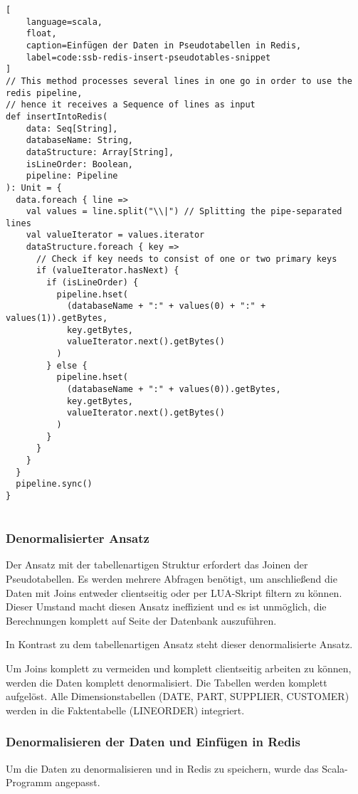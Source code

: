 \begin{lstlisting}[
    language=scala,
    float,
    caption=Einfügen der Daten in Pseudotabellen in Redis,
    label=code:ssb-redis-insert-pseudotables-snippet
]
// This method processes several lines in one go in order to use the redis pipeline,
// hence it receives a Sequence of lines as input
def insertIntoRedis(
    data: Seq[String],
    databaseName: String,
    dataStructure: Array[String],
    isLineOrder: Boolean,
    pipeline: Pipeline
): Unit = {
  data.foreach { line =>
    val values = line.split("\\|") // Splitting the pipe-separated lines
    val valueIterator = values.iterator
    dataStructure.foreach { key =>
      // Check if key needs to consist of one or two primary keys
      if (valueIterator.hasNext) {
        if (isLineOrder) {
          pipeline.hset(
            (databaseName + ":" + values(0) + ":" + values(1)).getBytes,
            key.getBytes,
            valueIterator.next().getBytes()
          )
        } else {
          pipeline.hset(
            (databaseName + ":" + values(0)).getBytes,
            key.getBytes,
            valueIterator.next().getBytes()
          )
        }
      }
    }
  }
  pipeline.sync()
}


\end{lstlisting}

\subsubsection{Denormalisierter Ansatz}
Der Ansatz mit der tabellenartigen Struktur erfordert das Joinen der Pseudotabellen.
Es werden mehrere Abfragen benötigt, um anschließend die Daten mit Joins entweder clientseitig oder per LUA-Skript filtern zu können.
Dieser Umstand macht diesen Ansatz ineffizient und es ist unmöglich, die Berechnungen komplett auf Seite der Datenbank auszuführen.

In Kontrast zu dem tabellenartigen Ansatz steht dieser denormalisierte Ansatz.

Um Joins komplett zu vermeiden und komplett clientseitig arbeiten zu können, werden die Daten komplett denormalisiert.
Die Tabellen werden komplett aufgelöst.
Alle Dimensionstabellen (DATE, PART, SUPPLIER, CUSTOMER) werden in die Faktentabelle (LINEORDER) integriert.

\subsubsection{Denormalisieren der Daten und Einfügen in Redis}
Um die Daten zu denormalisieren und in Redis zu speichern, wurde das Scala-Programm angepasst.

